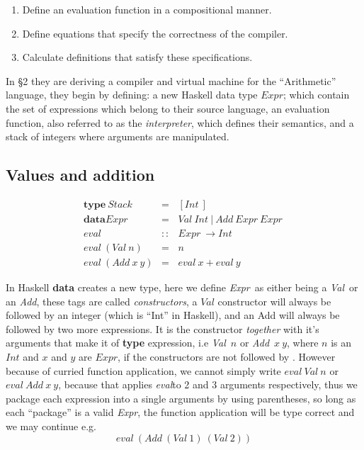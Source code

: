 \documentclass {article}
\begin{document}
\begin{enumerate}
	\item Define an evaluation function
		in a compositional manner.
	\item Define equations that specify
		the correctness of the compiler.
	\item Calculate definitions that 
		satisfy these specifications.
\end{enumerate}

In \S2 they are deriving a compiler
and virtual machine for the ``Arithmetic'' language,
they begin by defining: a new Haskell data type $Expr$;
which contain the set of expressions which belong to their source language,
an evaluation function, also referred to as the \emph{interpreter},
which defines their semantics,
and a stack of integers where 
arguments are manipulated.
\newcommand{\eval}{\textit{eval}}
\newcommand{\expr}{\textit{Expr}}
\newcommand{\val}{\textit{Val}}
\newcommand{\add}{\textit{Add}}
\newcommand{\code}{\textit{Code}}
\newcommand{\Val}{\mathit{Val\ }}
\newcommand{\Add}{\mathit{Add\ }}
\newcommand{\evalf}{\mathit{eval\ }}
\newcommand{\Expr}{\mathit{Expr\ }}
\newcommand{\Int}{\mathit{Int\ }}
\newcommand{\Code}{\mathit{Code\ }}

\subsection{Values and addition}

\begin{eqnarray}
\textbf{type} \ Stack &=& [\Int] \nonumber \\
\textbf{data} \Expr &=& \Val \Int | \ \Add \Expr \Expr \nonumber \\
\evalf &::& \Expr \rightarrow \mathit{Int} \nonumber \\ 
\evalf (\Val  n) &=& n \label{evalval}\\
\evalf (\Add  x\  y) &=& \evalf  x + \evalf  y \label{evaladd}
\end{eqnarray}

In Haskell \textbf{data} creates a new type,
here we define \expr\ as either being a \val\
or an \add, these tags are called \emph{constructors},
a $Val$ constructor will always be followed by an integer
(which is ``Int'' in Haskell),
and an Add will always be followed by two more expressions.
It is the constructor \emph{together} with 
it's arguments that make it of \textbf{type}
expression, i.e \val\ $n$ or \add\ $x\ y$,
where $n$ is an $Int$ and $x$ and $y$ are $Expr$,
if the constructors are not followed by .
However because of curried function application,
we cannot simply write 
$\evalf  Val\ n$ or $\evalf  \Add x\ y$,
because that applies \eval to 2 and 3 arguments respectively,
thus we package each expression into a single arguments
by using parentheses, so long as each ``package'' is a
valid \expr, the function application will be type correct
and we may continue e.g.
\[ \evalf (\Add (\Val 1)\ (\Val 2)) \]
\end{document}
